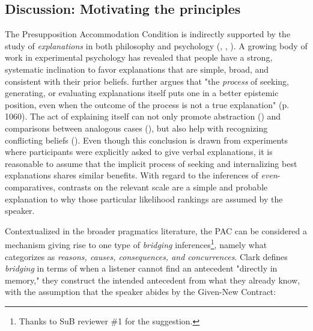 \documentclass[12pt,letterpaper]{scrartcl}
\begin{document}



\subsection{Discussion: Motivating the principles}

The Presupposition Accommodation Condition is indirectly supported by the study of \textit{explanations} in both philosophy and psychology (\cite{harman_inference_1965}, \cite{lombrozo_explanatory_2016}, \cite{wilkenfeld_inference_2015}). A growing body of work in experimental psychology has revealed that people have a strong, systematic inclination to favor explanations that are simple, broad, and consistent with their prior beliefs. \cite{wilkenfeld_inference_2015} further argues that "the \textit{process} of seeking, generating, or evaluating explanations itself puts one in a better epistemic position, even when the outcome of the process is not a true explanation" (p. 1060). The act of explaining itself can not only promote abstraction (\cite{williams_role_2010}) and comparisons between analogous cases (\cite{edwards_explanation_2019}), but also help with recognizing conflicting beliefs (\cite{chi_eliciting_1994}). Even though this conclusion is drawn from experiments where participants were explicitly asked to give verbal explanations, it is reasonable to assume that the implicit process of seeking and internalizing best explanations shares similar benefits. With regard to the inferences of \textit{even}-comparatives, contrasts on the relevant scale are a simple and probable explanation to why those particular likelihood rankings are assumed by the speaker.

Contextualized in the broader pragmatics literature, the PAC can be considered a mechanism giving rise to one type of \textit{bridging} inferences\footnote{Thanks to SuB reviewer \#1 for the suggestion.}, namely what \cite{clark_bridging_1975} categorizes as \textit{reasons, causes, consequences, and concurrences}. Clark defines \textit{bridging} in terms of when a listener cannot find an antecedent "directly in memory," they construct the intended antecedent from what they already know, with the assumption that the speaker abides by the Given-New Contract:
\end{document}

